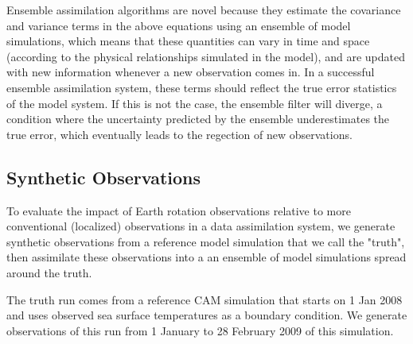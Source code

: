 
Ensemble assimilation algorithms are novel because they estimate the covariance and variance terms in the above equations using an ensemble of model simulations, which means that these quantities can vary in time and space (according to the physical relationships simulated in the model), and are updated with new information whenever a new observation comes in.  
%
%
%
In a successful ensemble assimilation system, these terms should reflect the true error statistics of the model system.
If this is not the case, the ensemble filter will diverge, a condition where the uncertainty predicted by the ensemble underestimates the true error, which eventually leads to the regection of new observations.


%


\subsection{Synthetic Observations}

To evaluate the impact of Earth rotation observations relative to more conventional (localized) observations in a data assimilation system, we generate synthetic observations from a reference model simulation that we call the "truth", then assimilate these observations into a an ensemble of model simulations spread around the truth.  

The truth run comes from a reference CAM simulation that starts on 1 Jan 2008 and uses observed sea surface temperatures as a boundary condition. 
We generate observations of this run from 1 January to 28 February 2009 of this simulation. 


